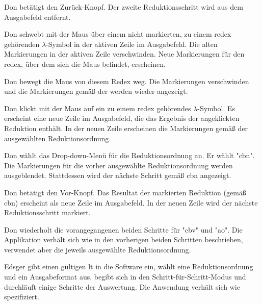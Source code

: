 \documentclass[parskip=full,11pt,twoside]{scrartcl}
\begin{document}
{Don betätigt den Zurück-Knopf.}
{Der zweite Reduktionsschritt wird aus dem Ausgabefeld entfernt.}

{Don schwebt mit der Maus über einem nicht markierten, zu einem \gls{redex} gehörenden
$\lambda$-Symbol in der aktiven Zeile im Ausgabefeld.}
{Die alten Markierungen in der aktiven Zeile verschwinden. Neue Markierungen für den \gls{redex}, über dem
sich die Maus befindet, erscheinen.}

{Don bewegt die Maus von diesem Redex weg.}
{Die Markierungen verschwinden und die Markierungen gemäß der 
werden wieder angezeigt.}

{Don klickt mit der Maus auf ein zu einem \gls{redex} gehörendes $\lambda$-Symbol.}
{Es erscheint eine neue Zeile im Ausgabefeld, die das Ergebnis der angeklickten
Reduktion enthält. In der neuen Zeile erscheinen die Markierungen gemäß der ausgewählten
Reduktionsordnung.}

{Don wählt das Drop-down-Menü für die Reduktionsordnung an. Er wählt "\gls{cbn}".}
{Die Markierungen für die vorher ausgewählte Reduktionsordnung werden ausgeblendet.
Stattdessen wird der nächste Schritt gemäß \gls{cbn} angezeigt.}

{Don betätigt den Vor-Knopf.}
{Das Resultat der markierten Reduktion (gemäß \gls{cbn}) erscheint als neue Zeile im Ausgabefeld.
In der neuen Zeile wird der nächste Reduktionsschritt markiert.}

{Don wiederholt die vorangegangenen beiden Schritte für "\gls{cbv}" und "\gls{ao}".}
{Die Applikation verhält sich wie in den vorherigen beiden Schritten beschrieben,
verwendet aber die jeweils ausgewählte Reduktionsordnung.}


{Edsger gibt einen gültigen \gls{lt} in die Software ein, wählt eine Reduktionsordnung und ein
Ausgabeformat aus, begibt sich in den Schritt-für-Schritt-Modus und durchläuft einige
Schritte der Auswertung.}
{Die Anwendung verhält sich wie spezifiziert.}
\end{document}
